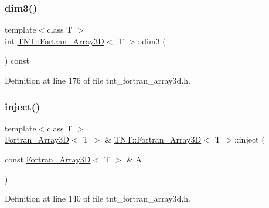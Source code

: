 \subsubsection{\texorpdfstring{dim3()}{dim3()}}
{\footnotesize\ttfamily template$<$class T $>$ \\
int \hyperlink{classTNT_1_1Fortran__Array3D}{T\+N\+T\+::\+Fortran\+\_\+\+Array3D}$<$ T $>$\+::dim3 (\begin{DoxyParamCaption}{ }\end{DoxyParamCaption}) const\hspace{0.3cm}{\ttfamily [inline]}}



Definition at line 176 of file tnt\+\_\+fortran\+\_\+array3d.\+h.

\mbox{\label{classTNT_1_1Fortran__Array3D_aa2b78e3242a7506843c10642fc289ce1}} 
\subsubsection{\texorpdfstring{inject()}{inject()}}
{\footnotesize\ttfamily template$<$class T $>$ \\
\hyperlink{classTNT_1_1Fortran__Array3D}{Fortran\+\_\+\+Array3D}$<$ T $>$ \& \hyperlink{classTNT_1_1Fortran__Array3D}{T\+N\+T\+::\+Fortran\+\_\+\+Array3D}$<$ T $>$\+::inject (\begin{DoxyParamCaption}\item[{const \hyperlink{classTNT_1_1Fortran__Array3D}{Fortran\+\_\+\+Array3D}$<$ T $>$ \&}]{A }\end{DoxyParamCaption})}



Definition at line 140 of file tnt\+\_\+fortran\+\_\+array3d.\+h.

\mbox{\label{classTNT_1_1Fortran__Array3D_a18c12002351d9b7ef7cd1b483ebb1c9f}} 
